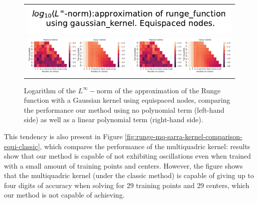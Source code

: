 \documentclass[12pt]{report} %
\begin{document}
\begin{figure}[H]
  \begin{tabular}{cc}
    \multicolumn{2}{c}{{\includegraphics[width=.5\textwidth]
    {imagenes/experiments/1d/variational/linf_runge_function_gaussian_kernel_Equi_Classic_Title.pdf}}}                                                                                       \\
    {\includegraphics[height=.4\textwidth, trim={0 0 11.5cm 0},clip=true]
    {imagenes/experiments/1d/variational/linf_runge_function_gaussian_kernel_Equi_Classic_Comparison.pdf}}  &
     {\includegraphics[height=.4\textwidth, trim={9.5cm 0 0 0},clip=true]{imagenes/experiments/1d/variational/linf_runge_function_gaussian_kernel_Equi_Classic_Comparison.pdf}} \\
  \end{tabular}
  \caption{Logarithm of the $L^\infty-$norm of the approximation of the Runge function with a Gaussian kernel using equispaced nodes, comparing the performance our method using no polynomial term (left-hand side) as well as a linear polynomial term (right-hand side).}
  \label{fig:runge-gaussian-comparison-equi-classic}
\end{figure}

This tendency is also present in Figure \ref{fig:runge-mq-sarra-kernel-comparison-equi-classic}, which compares the performance of the multiquadric kernel: %
results show that our method is capable of not exhibiting oscillations even when trained with a small amount of training points and centers.
However, the figure shows that the multiquadric kernel (under the classic method) is capable of giving up to four digits of accuracy when solving for 29 training points and 29 centers, which our method is not capable of achieving.
\end{document}
